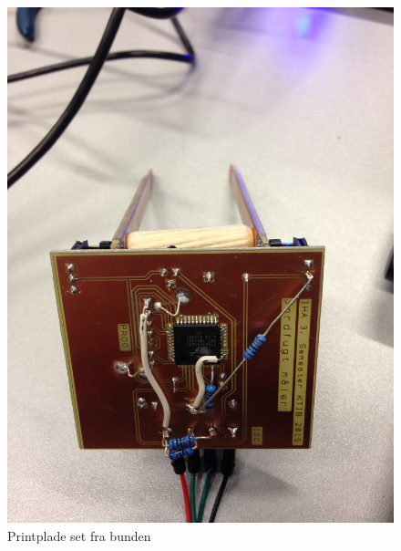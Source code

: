 \begin{figure}[H]
	\centering 
	\includegraphics[scale=0.1]{HardwareArkitektur/Sensore/Jordfugt_billeder/Print_2.jpg}
	\caption{Printplade set fra bunden}
	\label{photo:Print_2}
\end{figure} 

